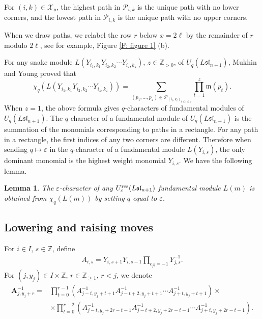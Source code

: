 \documentclass[12pt, reqno]{amsart}
\newtheorem{lemma}[theorem]{Lemma}
\numberwithin{equation}{section}
\newcommand{\res}{{\rm res}}
\begin{document}
{For $(i,k) \in \mathcal{X}_{\mathfrak{a}}$, the highest path in $\mathscr{P}_{i,k}$ is the unique path with no lower corners, and the lowest path in $\mathscr{P}_{i,k}$ is the unique path with no upper corners.


When we draw paths, we relabel the row $r$ below $x=2 \ell$ by the remainder of $r$ modulo $2 \ell$, see for example, Figure \ref{F: figure 1} (b).


For any snake module $L(Y_{i_1, k_1}Y_{i_2, k_2}\cdots Y_{i_z,k_z})$, $z \in \mathbb{Z}_{>0}$, of $U_q(L\mathfrak{sl}_{n+1})$, Mukhin and Young {\cite[Theorem 6.1]{MY12a}} proved that
\[
\chi_q(L(Y_{i_1, k_1}Y_{i_2, k_2}\cdots Y_{i_z, k_z}))=\sum_{(p_{1},\ldots,p_{z}) \in \overline{\mathscr{P}}_{(i_t,k_t)_{1 \leq t \leq z}}} \prod_{t=1}^{z}\mathfrak{m}(p_{t}).
\]
When $z=1$, the above formula gives $q$-characters of fundamental modules of $U_q(L\mathfrak{sl}_{n+1})$. The $q$-character of a fundamental module of $U_q(L\mathfrak{sl}_{n+1})$ is the summation of the monomials corresponding to paths in a rectangle. For any path in a rectangle, the first indices of any two corners are different. Therefore when sending $q \mapsto \varepsilon$ in the $q$-character of a fundamental module $L(Y_{i,s})$, the only dominant monomial is the highest weight monomial $Y_{i,s}$. We have the following lemma.
\begin{lemma}
The $\varepsilon$-character of any $U_{\varepsilon}^{\res}({L\mathfrak{sl}_{n+1}})$ fundamental module $L(m)$ is obtained from $\chi_{q}(L(m))$ by setting $q$ equal to $\varepsilon$.
\end{lemma}

\subsection{Lowering and raising moves}\label{subsec:lowdef}
For $i\in I$, $s\in \mathbb{Z}$, define
\begin{align*}
 A_{i,s} = Y_{i,s+1} Y_{i,s-1} \prod_{c_{ji}=-1} Y_{j,s}^{-1}.
\end{align*}
For $(j,y_j)\in I\times \mathbb{Z}$, $r\in \mathbb{Z}_{\geq 1}$, $r<j$, we denote
\begin{align*}
\textbf{A}_{j,y_j+r}^{-1}=&\prod_{t=0}^{r-1}(A_{j-t,y_j+t+1}^{-1}A_{j-t+2,y_j+t+1}^{-1}\cdots A_{j+t,y_j+t+1}^{-1}) \times\\
&\times \prod_{t=0}^{r-2} (A_{j-t,y_j+2r-t-1}^{-1}A_{j-t+2,y_j+2r-t-1}^{-1}\cdots A_{j+t,y_j+2r-t-1}^{-1}).
\end{align*}



}
\end{document}
